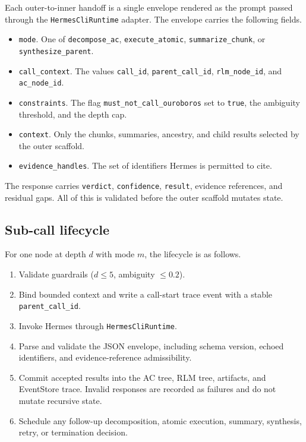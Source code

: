 \documentclass[11pt,a4paper]{article}
\begin{document}
Each outer-to-inner handoff is a single envelope rendered as the prompt
passed through the \texttt{HermesCliRuntime} adapter. The envelope carries
the following fields.

\begin{itemize}[leftmargin=*]
\item \texttt{mode}. One of \texttt{decompose\_ac}, \texttt{execute\_atomic},
      \texttt{summarize\_chunk}, or \texttt{synthesize\_parent}.
\item \texttt{call\_context}. The values \texttt{call\_id},
      \texttt{parent\_call\_id}, \texttt{rlm\_node\_id}, and
      \texttt{ac\_node\_id}.
\item \texttt{constraints}. The flag \texttt{must\_not\_call\_ouroboros} set
      to \texttt{true}, the ambiguity threshold, and the depth cap.
\item \texttt{context}. Only the chunks, summaries, ancestry, and child
      results selected by the outer scaffold.
\item \texttt{evidence\_handles}. The set of identifiers Hermes is
      permitted to cite.
\end{itemize}

The response carries \texttt{verdict}, \texttt{confidence}, \texttt{result},
evidence references, and residual gaps. All of this is validated before the
outer scaffold mutates state.

\subsection{Sub-call lifecycle}
\label{sec:lifecycle}

For one node at depth $d$ with mode $m$, the lifecycle is as follows.

\begin{enumerate}[leftmargin=*]
\item Validate guardrails ($d \le 5$, ambiguity $\le 0.2$).
\item Bind bounded context and write a call-start trace event with a
      stable \texttt{parent\_call\_id}.
\item Invoke Hermes through \texttt{HermesCliRuntime}.
\item Parse and validate the JSON envelope, including schema version,
      echoed identifiers, and evidence-reference admissibility.
\item Commit accepted results into the AC tree, RLM tree, artifacts, and
      EventStore trace. Invalid responses are recorded as failures and
      do not mutate recursive state.
\item Schedule any follow-up decomposition, atomic execution, summary,
      synthesis, retry, or termination decision.
\end{enumerate}
\end{document}

